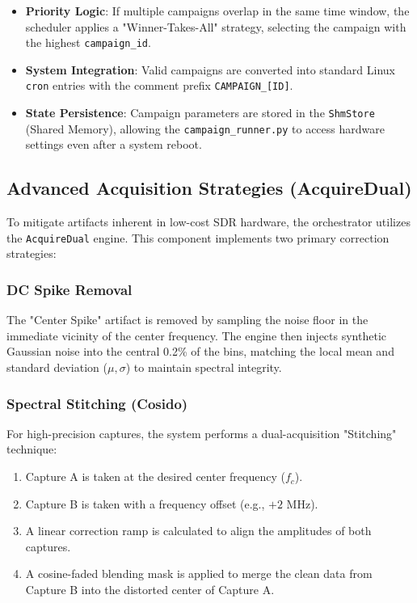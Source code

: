 \documentclass{article}
\begin{document}
\begin{itemize}
    \item \textbf{Priority Logic}: If multiple campaigns overlap in the same time window, the scheduler applies a "Winner-Takes-All" strategy, selecting the campaign with the highest \texttt{campaign\_id}.
    \item \textbf{System Integration}: Valid campaigns are converted into standard Linux \texttt{cron} entries with the comment prefix \texttt{CAMPAIGN\_[ID]}.
    \item \textbf{State Persistence}: Campaign parameters are stored in the \texttt{ShmStore} (Shared Memory), allowing the \texttt{campaign\_runner.py} to access hardware settings even after a system reboot.
\end{itemize}

\subsection{Advanced Acquisition Strategies (AcquireDual)}
To mitigate artifacts inherent in low-cost SDR hardware, the orchestrator utilizes the \texttt{AcquireDual} engine. This component implements two primary correction strategies:

\subsubsection{DC Spike Removal}
The "Center Spike" artifact is removed by sampling the noise floor in the immediate vicinity of the center frequency. The engine then injects synthetic Gaussian noise into the central 0.2\% of the bins, matching the local mean and standard deviation ($\mu, \sigma$) to maintain spectral integrity.

\subsubsection{Spectral Stitching (Cosido)}
For high-precision captures, the system performs a dual-acquisition "Stitching" technique:
\begin{enumerate}
    \item Capture A is taken at the desired center frequency ($f_c$).
    \item Capture B is taken with a frequency offset (e.g., $+2$ MHz).
    \item A linear correction ramp is calculated to align the amplitudes of both captures.
    \item A cosine-faded blending mask is applied to merge the clean data from Capture B into the distorted center of Capture A.
\end{enumerate}
\end{document}
